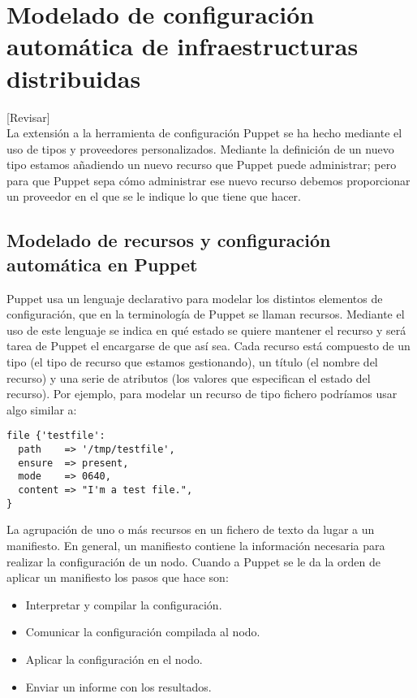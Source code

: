 \chapter{Modelado de configuración automática de infraestructuras distribuidas}
\label{cap:modelado}

[Revisar]\\

La extensión a la herramienta de configuración Puppet se ha hecho mediante el uso de tipos y proveedores personalizados. Mediante la definición de un nuevo tipo estamos añadiendo un nuevo recurso que Puppet puede administrar; pero para que Puppet sepa cómo administrar ese nuevo recurso debemos proporcionar un proveedor en el que se le indique lo que tiene que hacer.


\section{Modelado de recursos y configuración automática en Puppet}

Puppet usa un lenguaje declarativo para modelar los distintos elementos de configuración, que en la terminología de Puppet se llaman recursos. Mediante el uso de este lenguaje se indica en qué estado se quiere mantener el recurso y será tarea de Puppet el encargarse de que así sea. Cada recurso está compuesto de un tipo (el tipo de recurso que estamos gestionando), un título (el nombre del recurso) y una serie de atributos (los valores que especifican el estado del recurso). Por ejemplo, para modelar un recurso de tipo fichero podríamos usar algo similar a:

\begin{lstlisting}
file {'testfile':
  path    => '/tmp/testfile',
  ensure  => present,
  mode    => 0640,
  content => "I'm a test file.",
}
\end{lstlisting}

La agrupación de uno o más recursos en un fichero de texto da lugar a un manifiesto. En general, un manifiesto contiene la información necesaria para realizar la configuración de un nodo. Cuando a Puppet se le da la orden de aplicar un manifiesto los pasos que hace son:
\begin{itemize}
\item Interpretar y compilar la configuración.
\item Comunicar la configuración compilada al nodo.
\item Aplicar la configuración en el nodo.
\item Enviar un informe con los resultados.
\end{itemize}


